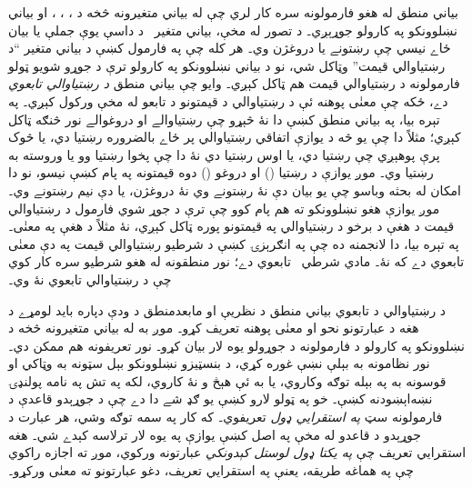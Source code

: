 \documentclass[12pt,a4paper,oneside]{report}
\newcommand{\olfileid}[3]{\gdef\pspart{#1}\gdef\pschapter{#2}\gdef\pssection{#3}}
\gdef\pspart{#2}\gdef\pschapter{#3}\gdef\pssection{}%
\theoremstyle{definition}
\begin{document}
\label{olpseg:OLP-0057-B004:start}
\olfileid{pl}{syn}{int}
\label{olpseg:OLP-0057-B004:end}

\label{olpseg:OLP-0057-B005:start}
\label{olpseg:OLP-0057-B005:end}

\label{olpseg:OLP-0057-B006:start}
بياني منطق له هغو فارمولونه سره کار لري چې له
بياني متغيرونه څخه د \LR{$\lnot$}، \LR{$\land$}، \LR{$\lor$}، \LR{$\lif$} او
\LR{$\liff$} بياني نښلوونکو په کارولو جوړېږي۔ د تصور له مخې،
بياني متغير~ د داسې يوې جملې يا بيان ځاے نيسي
چې رښتونے يا دروغژن وي۔ هر کله چې په فارمول کښې د
بياني متغير ``د رښتياوالي قيمت'' وټاکل شي، نو د
بياني نښلوونکو په کارولو ترې د جوړو شويو ټولو فارمولونه د
رښتياوالي قيمت هم ټاکل کېږي۔ وايو چې بياني منطق \emph{د رښتياوالي
  تابعوي} دے، ځکه چې معنٰی پوهنه ئې د رښتياوالي د قيمتونو د تابعو
له مخې ورکول کېږي۔ په تېره بيا، په بياني منطق کښې دا نۀ څېړو چې
رښتياوالے او دروغوالے نور څنګه ټاکل کېږي؛ مثلاً دا چې يو څه د يوازې
اتفاقي رښتياوالي پر ځاے بالضروره رښتيا دي، يا څوک پرې پوهېږي چې
رښتيا دي، يا اوس رښتيا دي نۀ دا چې پخوا رښتيا وو يا وروسته به رښتيا
وي۔ موږ يوازې د رښتيا (\LR{$\True$}) او دروغو (\LR{$\False$}) دوه قيمتونه په
پام کښې نيسو، نو دا امکان له بحثه وباسو چې يو بيان دې نۀ رښتونے وي
نۀ دروغژن، يا دې نيم رښتونے وي۔ موږ يوازې هغو نښلوونکو ته هم پام
کوو چې ترې د جوړ شوي فارمول د رښتياوالي قيمت د هغې د برخو د
رښتياوالي په قيمتونو پوره ټاکل کېږي، نۀ مثلاً د هغې په معنٰی۔ په
تېره بيا، دا لانجمنه ده چې په انګرېزۍ کښې د شرطيو رښتياوالي قيمت په
دې معنٰی تابعوي دے که نۀ۔ مادي شرطي~\LR{$\lif$} تابعوي دے؛ نور منطقونه
له هغو شرطيو سره کار کوي چې د رښتياوالي تابعوي نۀ وي۔
\label{olpseg:OLP-0057-B006:end}

\label{olpseg:OLP-0057-B007:start}
د رښتياوالي د تابعوي بياني منطق د نظريې او مابعدمنطق د ودې دپاره
بايد لومړے د هغه د عبارتونو نحو او معنٰی پوهنه تعريف کړو۔ موږ به له
بياني متغيرونه څخه د نښلوونکو په کارولو د فارمولونه
د جوړولو يوه لار بيان کړو۔ نور تعريفونه هم ممکن دي۔ نور نظامونه به
بېلې نښې غوره کړي، د بنسټيزو نښلوونکو بېل سټونه به وټاکي او قوسونه
به په بېله توګه وکاروي، يا به ئې هېڅ و نۀ کاروي، لکه په تش په نامه
پولنډۍ نښه‌اېښودنه کښې۔ خو په ټولو لارو کښې يو ګډ شے دا دے چې د
جوړېدو قاعدې د فارمولونه سټ \emph{په استقرايي ډول} تعريفوي۔ که
کار په سمه توګه وشي، هر عبارت د جوړېدو د قاعدو له مخې په اصل کښې
يوازې په يوه لار ترلاسه کېدے شي۔ هغه استقرايي تعريف چې
\emph{په يکتا ډول لوستل کېدونکي} عبارتونه ورکوي، موږ ته اجازه راکوي
چې په هماغه طريقه، يعنې په استقرايي تعريف، دغو عبارتونو ته معنٰی
ورکړو۔
\label{olpseg:OLP-0057-B007:end}
\end{document}
